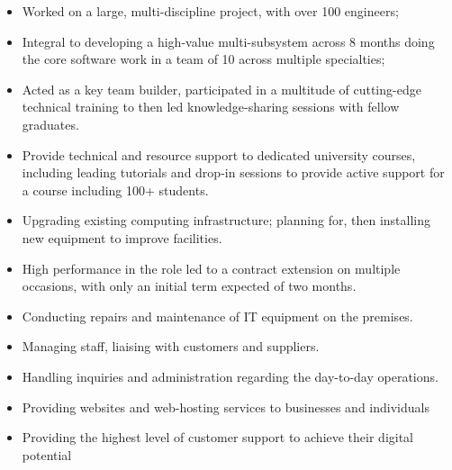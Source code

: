 \documentclass[8pt,a4paper]{altacv}
\begin{document}
\begin{itemize}
\item Worked on a large, multi-discipline project, with over 100 engineers;
\item Integral to developing a high-value multi-subsystem across 8 months  doing the core software work in a team of 10 across multiple specialties;
\item Acted as a key team builder, participated in a multitude of cutting-edge technical training to then led knowledge-sharing sessions with fellow graduates. 

\divider
\end{itemize}

\begin{itemize}
\item Provide technical and resource support to dedicated university courses, including leading tutorials and drop-in sessions to provide active support for a course including 100+ students.
\item Upgrading existing computing infrastructure; planning for, then installing new equipment to improve facilities.
\item High performance in the role led to a contract extension on multiple occasions, with only an initial term expected of two months.

\divider
\end{itemize}

\begin{itemize}
\item Conducting repairs and maintenance of IT equipment on the premises.
\item Managing staff, liaising with customers and suppliers. 
\item Handling inquiries and administration regarding the day-to-day operations.
\divider
\end{itemize}

\begin{itemize}
\item Providing websites and web-hosting services to businesses and individuals
\item Providing the highest level of customer support to achieve their digital potential 
\end{itemize}
\divider
\end{document}
